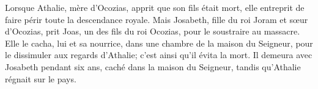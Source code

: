 Lorsque Athalie, mère d’Ocozias, apprit que son fils était mort,
	elle entreprit de faire périr toute la descendance royale.
Mais Josabeth, fille du roi Joram et sœur d’Ocozias,
	prit Joas, un des fils du roi Ocozias, pour le soustraire au massacre.
Elle le cacha, lui et sa nourrice, dans une chambre de la maison du Seigneur,
	pour le dissimuler aux regards d’Athalie;
	c’est ainsi qu’il évita la mort.
Il demeura avec Josabeth pendant six ans, caché dans la maison du Seigneur,
	tandis qu’Athalie régnait sur le pays.
